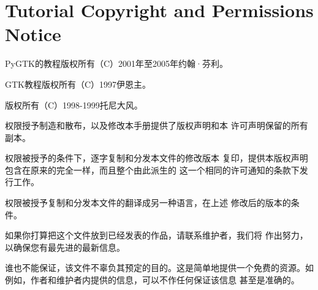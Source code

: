 \chapter{Tutorial Copyright and Permissions Notice}
PyGTK的教程版权所有（C）2001年至2005年约翰·芬利。

GTK教程版权所有（C）1997伊恩主。

版权所有（C）1998-1999托尼大风。

权限授予制造和散布，以及修改本手册提供了版权声明和本
许可声明保留的所有副本。

权限被授予的条件下，逐字复制和分发本文件的修改版本
复印，提供本版权声明包含在原来的完全一样，而且整个由此派生的
这一个相同的许可通知的条款下发行工作。

权限被授予复制和分发本文件的翻译成另一种语言，在上述
修改后的版本的条件。

如果你打算把这个文件放到已经发表的作品，请联系维护者，我们将
作出努力，以确保您有最先进的最新信息。

谁也不能保证，该文件不辜负其预定的目的。这是简单地提供一个免费的资源。如
例如，作者和维护者内提供的信息，可以不作任何保证该信息
甚至是准确的。
